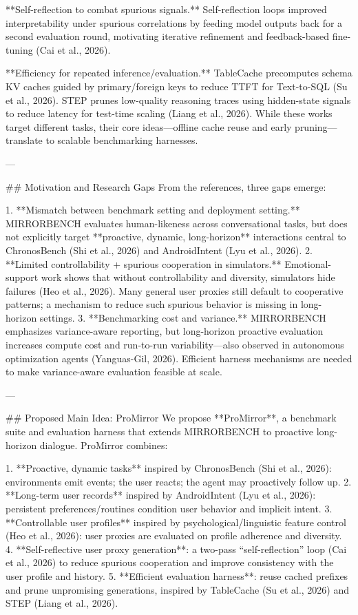 **Self-reflection to combat spurious signals.** Self-reflection loops improved interpretability under spurious correlations by feeding model outputs back for a second evaluation round, motivating iterative refinement and feedback-based fine-tuning (Cai et al., 2026).  

**Efficiency for repeated inference/evaluation.** TableCache precomputes schema KV caches guided by primary/foreign keys to reduce TTFT for Text-to-SQL (Su et al., 2026). STEP prunes low-quality reasoning traces using hidden-state signals to reduce latency for test-time scaling (Liang et al., 2026). While these works target different tasks, their core ideas—offline cache reuse and early pruning—translate to scalable benchmarking harnesses.

---

## Motivation and Research Gaps  
From the references, three gaps emerge:

1. **Mismatch between benchmark setting and deployment setting.** MIRRORBENCH evaluates human-likeness across conversational tasks, but does not explicitly target **proactive, dynamic, long-horizon** interactions central to ChronosBench (Shi et al., 2026) and AndroidIntent (Lyu et al., 2026).  
2. **Limited controllability + spurious cooperation in simulators.** Emotional-support work shows that without controllability and diversity, simulators hide failures (Heo et al., 2026). Many general user proxies still default to cooperative patterns; a mechanism to reduce such spurious behavior is missing in long-horizon settings.  
3. **Benchmarking cost and variance.** MIRRORBENCH emphasizes variance-aware reporting, but long-horizon proactive evaluation increases compute cost and run-to-run variability—also observed in autonomous optimization agents (Yanguas-Gil, 2026). Efficient harness mechanisms are needed to make variance-aware evaluation feasible at scale.

---

## Proposed Main Idea: ProMirror  
We propose **ProMirror**, a benchmark suite and evaluation harness that extends MIRRORBENCH to proactive long-horizon dialogue. ProMirror combines:

1. **Proactive, dynamic tasks** inspired by ChronosBench (Shi et al., 2026): environments emit events; the user reacts; the agent may proactively follow up.  
2. **Long-term user records** inspired by AndroidIntent (Lyu et al., 2026): persistent preferences/routines condition user behavior and implicit intent.  
3. **Controllable user profiles** inspired by psychological/linguistic feature control (Heo et al., 2026): user proxies are evaluated on profile adherence and diversity.  
4. **Self-reflective user proxy generation**: a two-pass “self-reflection” loop (Cai et al., 2026) to reduce spurious cooperation and improve consistency with the user profile and history.  
5. **Efficient evaluation harness**: reuse cached prefixes and prune unpromising generations, inspired by TableCache (Su et al., 2026) and STEP (Liang et al., 2026).

